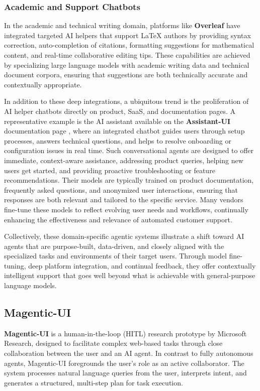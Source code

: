 \subsubsection{Academic and Support Chatbots}
In the academic and technical writing domain, platforms like \textbf{Overleaf} \cite{overleaf} have integrated targeted AI helpers that support LaTeX authors by providing syntax correction, auto-completion of citations, formatting suggestions for mathematical content, and real-time collaborative editing tips. These capabilities are achieved by specializing large language models with academic writing data and technical document corpora, ensuring that suggestions are both technically accurate and contextually appropriate.

In addition to these deep integrations, a ubiquitous trend is the proliferation of AI helper chatbots directly on product, SaaS, and documentation pages. A representative example is the AI assistant available on the \textbf{Assistant-UI} documentation page \cite{assistantui}, where an integrated chatbot guides users through setup processes, answers technical questions, and helps to resolve onboarding or configuration issues in real time. Such conversational agents are designed to offer immediate, context-aware assistance, addressing product queries, helping new users get started, and providing proactive troubleshooting or feature recommendations. Their models are typically trained on product documentation, frequently asked questions, and anonymized user interactions, ensuring that responses are both relevant and tailored to the specific service. Many vendors fine-tune these models to reflect evolving user needs and workflows, continually enhancing the effectiveness and relevance of automated customer support.

Collectively, these domain-specific agentic systems illustrate a shift toward AI agents that are purpose-built, data-driven, and closely aligned with the specialized tasks and environments of their target users. Through model fine-tuning, deep platform integration, and continual feedback, they offer contextually intelligent support that goes well beyond what is achievable with general-purpose language models.


\subsection{Magentic-UI}

\textbf{Magentic-UI} \cite{mozannar2025magenticuihumanintheloopagenticsystems} is a human-in-the-loop (HITL) research prototype by Microsoft Research, designed to facilitate complex web-based tasks through close collaboration between the user and an AI agent. In contrast to fully autonomous agents, Magentic-UI foregrounds the user's role as an active collaborator. The system processes natural language queries from the user, interprets intent, and generates a structured, multi-step plan for task execution.

